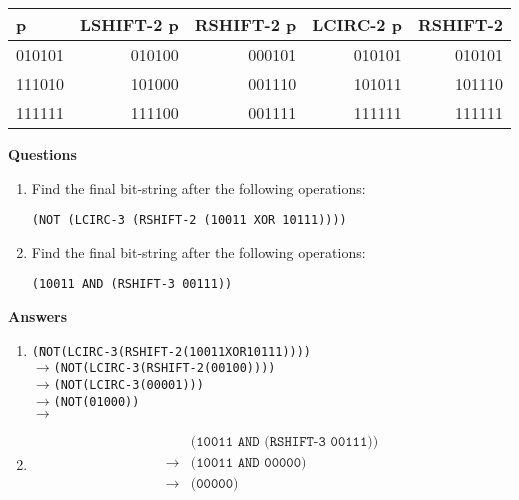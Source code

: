 \documentclass[12pt,letterpaper]{article}
\begin{document}
\begin{center}
  \begin{tabular}{| l || r | r | r | r |}
    \hline
    p & \textbf{LSHIFT-2} p & \textbf{RSHIFT-2} p & \textbf{LCIRC-2} p & \textbf{RSHIFT-2} \\
    \hline \hline
    010101 & 010100 & 000101 & 010101 & 010101 \\
    111010 & 101000 & 001110 & 101011 & 101110 \\
    111111 & 111100 & 001111 & 111111 & 111111 \\
    \hline
  \end{tabular}
\end{center}

\bigskip
\noindent \textbf{Questions}
\begin{enumerate}
\item Find the final bit-string after the following operations:

  \texttt{(NOT (LCIRC-3 (RSHIFT-2 (10011 XOR 10111))))}

\item Find the final bit-string after the following operations:

  \texttt{(10011 AND (RSHIFT-3 00111))}

\end{enumerate}

\pagebreak
\noindent \textbf{Answers}

\begin{enumerate}

\item \begin{alltt}
  \begin{tabbing}
    \hphantom{\(\rightarrow\)}\= (NOT (LCIRC-3 (RSHIFT-2 (10011 XOR 10111)))) \\
    \(\rightarrow\)\> (NOT (LCIRC-3 (RSHIFT-2 (00100)))) \\
    \(\rightarrow\)\> (NOT (LCIRC-3 (00001))) \\
    \(\rightarrow\)\> (NOT (01000)) \\
    \(\rightarrow\) \\
  \end{tabbing}
\end{alltt}

\item \begin{align*}
  & \texttt{(10011 AND (RSHIFT-3 00111))} \\
  \rightarrow& \texttt{(10011 AND 00000)} \\
  \rightarrow& \texttt{(00000)} \\
\end{align*}

\end{enumerate}
\end{document}
